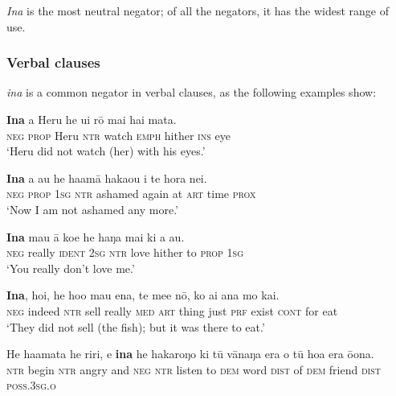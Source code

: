 \textit{{\ꞌ}Ina} is the most neutral negator; of all the negators, it has the widest range of use. 

\subsubsection{Verbal clauses}\label{sec:10.5.1.1}

\textit{{\ꞌ}ina} is a common negator in verbal clauses, as the following examples show:

\ea\label{ex:10.88}
\gll \textbf{{\ꞌ}Ina} a Heru he u{\ꞌ}i rō mai hai mata.\\
\textsc{neg} \textsc{prop} Heru \textsc{ntr} watch \textsc{emph} hither \textsc{ins} eye\\

\glt 
‘Heru did not watch (her) with his eyes.’ \textstyleExampleref{[R313.165]} 
\z

\ea\label{ex:10.89}
\gll \textbf{{\ꞌ}Ina} a au he ha{\ꞌ}amā haka{\ꞌ}ou {\ꞌ}i te hora nei. \\
\textsc{neg} \textsc{prop} \textsc{1sg} \textsc{ntr} ashamed again at \textsc{art} time \textsc{prox} \\

\glt 
‘Now I am not ashamed any more.’ \textstyleExampleref{[R334.069]} 
\z

\ea\label{ex:10.90}
\gll \textbf{{\ꞌ}Ina} mau {\ꞌ}ā koe he haŋa mai ki a au.\\
\textsc{neg} really \textsc{ident} \textsc{2sg} \textsc{ntr} love hither to \textsc{prop} \textsc{1sg}\\

\glt 
‘You really don’t love me.’ \textstyleExampleref{[R229.468]} 
\z

\ea\label{ex:10.91}
\gll \textbf{{\ꞌ}Ina}, ho{\ꞌ}i, he ho{\ꞌ}o mau ena, te me{\ꞌ}e nō, ko ai {\ꞌ}ana mo kai. \\
\textsc{neg} indeed \textsc{ntr} sell really \textsc{med} \textsc{art} thing just \textsc{prf} exist \textsc{cont} for eat \\

\glt 
‘They did not sell (the fish); but it was there to eat.’ \textstyleExampleref{[R539-1.365]}
\z

\ea\label{ex:10.92}
\gll He ha{\ꞌ}amata he riri, {\ꞌ}e \textbf{{\ꞌ}ina} he hakaroŋo ki tū vānaŋa era  o tū hoa era ō{\ꞌ}ona.\\
\textsc{ntr} begin \textsc{ntr} angry and \textsc{neg} \textsc{ntr} listen to \textsc{dem} word \textsc{dist}  of \textsc{dem} friend \textsc{dist} \textsc{poss.3sg.o}\\

